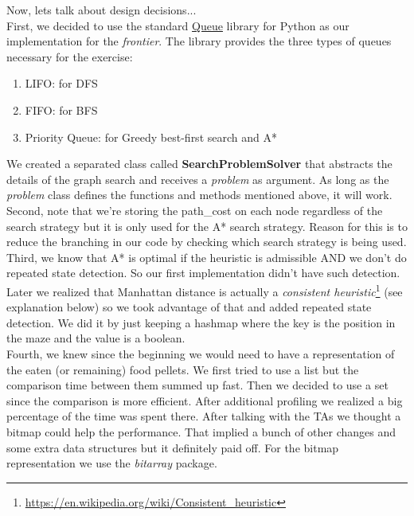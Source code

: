 \documentclass[11pt]{article}
\begin{document}
Now, lets talk about design decisions...\\
First, we decided to use the standard \href{https://docs.python.org/2/library/queue.html}{Queue} library for Python as our implementation for the \textit{frontier}. The library provides the three types of queues necessary for the exercise:
\begin{enumerate}
\item LIFO: for DFS
\item FIFO: for BFS
\item Priority Queue: for Greedy best-first search and A*
\end{enumerate}

We created a separated class called \textbf{SearchProblemSolver} that abstracts the details of the graph search and receives a \textit{problem} as argument. As long as the \textit{problem} class defines the functions and methods mentioned above, it will work.\\

Second, note that we're storing the path\_cost on each node regardless of the search strategy but it is only used for the A* search strategy. Reason for this is to reduce the branching in our code by checking which search strategy is being used.\\

Third, we know that A* is optimal if the heuristic is admissible AND we don't do repeated state detection. So our first implementation didn't have such detection. Later we realized that Manhattan distance is actually a \textit{consistent heuristic}\footnote{\url{https://en.wikipedia.org/wiki/Consistent\_heuristic}} (see explanation below) so we took advantage of that and added repeated state detection. We did it by just keeping a hashmap where the key is the position in the maze and the value is a boolean.\\

Fourth, we knew since the beginning we would need to have a representation of the eaten (or remaining) food pellets. We first tried to use a list but the comparison time between them summed up fast. Then we decided to use a set since the comparison is more efficient. After additional profiling we realized a big percentage of the time was spent there. After talking with the TAs we thought a bitmap could help the performance. That implied a bunch of other changes and some extra data structures but it definitely paid off. For the bitmap representation we use the \textit{bitarray} package.\\
\end{document}
